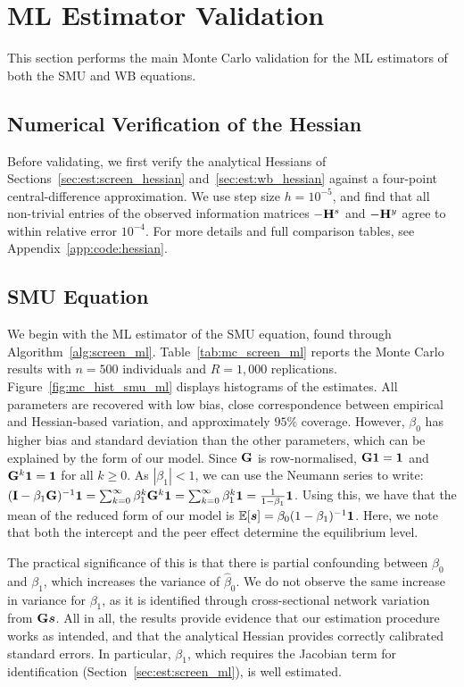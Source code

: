 \section{ML Estimator Validation}
\label{sec:mc:ml}
This section performs the main Monte Carlo validation for the ML estimators of both the SMU and WB equations.

\subsection{Numerical Verification of the Hessian}
\label{sec:mc:hessian_verification}
Before validating, we first verify the analytical Hessians of Sections~\ref{sec:est:screen_hessian} and~\ref{sec:est:wb_hessian} against a four-point central-difference approximation. We use step size $h = 10^{-5}$, and find that all non-trivial entries of the observed information matrices $-\mathbf{H}^s$ and $-\mathbf{H}^y$ agree to within relative error $10^{-4}$. For more details and full comparison tables, see Appendix~\ref{app:code:hessian}.

\subsection{SMU Equation}
\label{sec:mc:ml_screen}
We begin with the ML estimator of the SMU equation, found through Algorithm~\ref{alg:screen_ml}. Table~\ref{tab:mc_screen_ml} reports the Monte Carlo results with $n = 500$ individuals and $R = 1{,}000$ replications. Figure~\ref{fig:mc_hist_smu_ml} displays histograms of the estimates. All parameters are recovered with low bias, close correspondence between empirical and Hessian-based variation, and approximately $95\%$ coverage. However, $\beta_0$ has higher bias and standard deviation than the other parameters, which can be explained by the form of our model. Since $\mathbf{G}$ is row-normalised, $\mathbf{G}\bm{1} = \bm{1}$ and $\mathbf{G}^k\bm{1} = \bm{1}$ for all $k \geq 0$. As $|\beta_1| < 1$, we can use the Neumann series to write: $(\mathbf{I} - \beta_1\mathbf{G})^{-1}\bm{1} = \sum_{k=0}^{\infty} \beta_1^k \mathbf{G}^k \bm{1} = \sum_{k=0}^{\infty} \beta_1^k \bm{1} = \frac{1}{1-\beta_1}\bm{1}$. Using this, we have that the mean of the reduced form of our model is $\mathbb{E}[\bm{s}] = \beta_0(1 - \beta_1)^{-1}\bm{1}$. Here, we note that both the intercept and the peer effect determine the equilibrium level.

The practical significance of this is that there is partial confounding between $\beta_0$ and $\beta_1$, which increases the variance of $\hat\beta_0$. We do not observe the same increase in variance for $\beta_1$, as it is identified through cross-sectional network variation from $\mathbf{G}\bm{s}$. All in all, the results provide evidence that our estimation procedure works as intended, and that the analytical Hessian provides correctly calibrated standard errors. In particular, $\beta_1$, which requires the Jacobian term for identification (Section~\ref{sec:est:screen_ml}), is well estimated.

